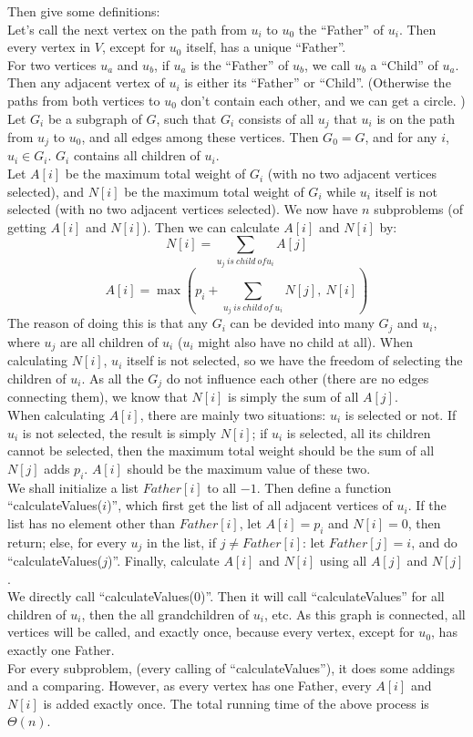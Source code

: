 \documentclass{6046}
\begin{document}
Then give some definitions: 
\\
Let's call the next vertex on the path from $u_i$ to $u_0$ the ``Father'' of $u_i$. 
Then every vertex in $V$, except for $u_0$ itself, has a unique ``Father''. 
\\
For two vertices $u_a$ and $u_b$, 
if $u_a$ is the ``Father'' of $u_b$, we call $u_b$ a ``Child'' of $u_a$. 
Then any adjacent vertex of $u_i$ is either its ``Father'' or ``Child''. 
(Otherwise the paths from both vertices to $u_0$ don't contain each other, 
and we can get a circle.
)
\\
Let $G_i$ be a subgraph of $G$, 
such that $G_i$ consists of all $u_j$ that $u_i$ is on the path from $u_j$ to $u_0$, 
and all edges among these vertices. 
Then $G_0 = G$, and for any $i$, $u_i \in G_i$. 
$G_i$ contains all children of $u_i$. 
\\
Let $A[i]$ be the maximum total weight of $G_i$ (with no two adjacent vertices selected), 
and $N[i]$ be the maximum total weight of $G_i$ 
while $u_i$ itself is not selected (with no two adjacent vertices selected). 
We now have $n$ subproblems (of getting $A[i]$ and $N[i]$). 
Then we can calculate $A[i]$ and $N[i]$ by: 
$$N[i] = \sum_{u_j\ is\ child\ of u_i} A[j] $$
$$A[i] = \max \left( p_i + \sum_{u_j\ is\ child\ of\ u_i} N[j],\ N[i]\right)$$
The reason of doing this is that any $G_i$ 
can be devided into many $G_j$ and $u_i$, where $u_j$ are all children of $u_i$
($u_i$ might also have no child at all). 
When calculating $N[i]$, $u_i$ itself is not selected, 
so we have the freedom of selecting the children of $u_i$. 
As all the $G_j$ do not influence each other (there are no edges connecting them), 
we know that $N[i]$ is simply the sum of all $A[j]$. 
\\
When calculating $A[i]$, there are mainly two situations: 
$u_i$ is selected or not. 
If $u_i$ is not selected, the result is simply $N[i]$; 
if $u_i$ is selected, all its children cannot be selected, 
then the maximum total weight should be the sum of all $N[j]$ adds $p_i$. 
$A[i]$ should be the maximum value of these two. 
\\
We shall initialize a list $Father[i]$ to all $-1$.
Then define a function ``calculateValues($i$)'', 
which first get the list of all adjacent vertices of $u_i$. 
If the list has no element other than $Father[i]$, let $A[i] = p_i$ and $N[i] = 0$, then return; else, 
for every $u_j$ in the list, if $j\neq Father[i]$: let 
$Father[j] = i$, and do ``calculateValues($j$)''. 
Finally, calculate $A[i]$ and $N[i]$ using all $A[j]$ and $N[j]$. 
\\
We directly call ``calculateValues($0$)''. 
Then it will call ``calculateValues'' for all children of $u_i$, 
then the all grandchildren of $u_i$, etc. 
As this graph is connected, all vertices will be called, and exactly once, 
because every vertex, except for $u_0$, has exactly one Father. 
\\
For every subproblem, (every calling of ``calculateValues''), 
it does some addings and a comparing. 
However, as every vertex has one Father, every 
$A[i]$ and $N[i]$ is added exactly once. 
The total running time of the above process is $\Theta(n)$. 
\\
\end{document}
